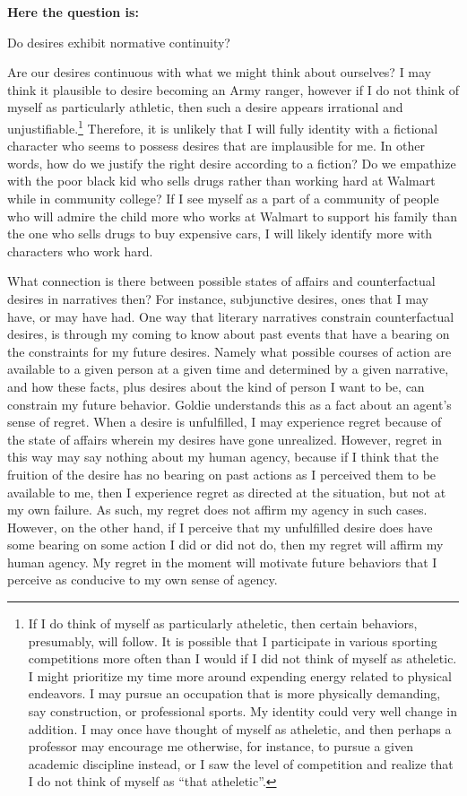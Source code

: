 \documentclass[
  letterpaper,
  DIV=11,
  numbers=noendperiod]{scrartcl}
\theoremstyle{remark}
\begin{document}
\textbf{Here the question is:}

Do desires exhibit normative continuity?

Are our desires continuous with what we might think about ourselves? I
may think it plausible to desire becoming an Army ranger, however if I
do not think of myself as particularly athletic, then such a desire
appears irrational and unjustifiable.\footnote{If I do think of myself
  as particularly atheletic, then certain behaviors, presumably, will
  follow. It is possible that I participate in various sporting
  competitions more often than I would if I did not think of myself as
  atheletic. I might prioritize my time more around expending energy
  related to physical endeavors. I may pursue an occupation that is more
  physically demanding, say construction, or professional sports. My
  identity could very well change in addition. I may once have thought
  of myself as atheletic, and then perhaps a professor may encourage me
  otherwise, for instance, to pursue a given academic discipline
  instead, or I saw the level of competition and realize that I do not
  think of myself as ``that atheletic''.} Therefore, it is unlikely that
I will fully identity with a fictional character who seems to possess
desires that are implausible for me. In other words, how do we justify
the right desire according to a fiction? Do we empathize with the poor
black kid who sells drugs rather than working hard at Walmart while in
community college? If I see myself as a part of a community of people
who will admire the child more who works at Walmart to support his
family than the one who sells drugs to buy expensive cars, I will likely
identify more with characters who work hard.

What connection is there between possible states of affairs and
counterfactual desires in narratives then? For instance, subjunctive
desires, ones that I may have, or may have had. One way that literary
narratives constrain counterfactual desires, is through my coming to
know about past events that have a bearing on the constraints for my
future desires. Namely what possible courses of action are available to
a given person at a given time and determined by a given narrative, and
how these facts, plus desires about the kind of person I want to be, can
constrain my future behavior. Goldie understands this as a fact about an
agent's sense of regret. When a desire is unfulfilled, I may experience
regret because of the state of affairs wherein my desires have gone
unrealized. However, regret in this way may say nothing about my human
agency, because if I think that the fruition of the desire has no
bearing on past actions as I perceived them to be available to me, then
I experience regret as directed at the situation, but not at my own
failure. As such, my regret does not affirm my agency in such cases.
However, on the other hand, if I perceive that my unfulfilled desire
does have some bearing on some action I did or did not do, then my
regret will affirm my human agency. My regret in the moment will
motivate future behaviors that I perceive as conducive to my own sense
of agency.
\end{document}
